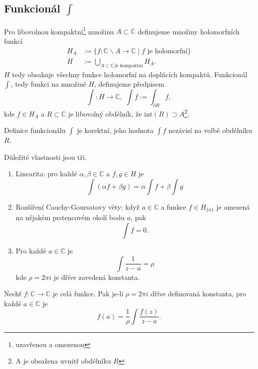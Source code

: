 \documentclass[../main.tex]{subfiles}
\begin{document}
\subsection{Funkcionál $\int$}

\begin{definition}[Funkcionál]
    Pro libovolnou kompaktní\footnote{uzavřenou a omezenou} množinu $A\subset\mathbb{C}$
    definujeme množiny holomorfních funkcí 
    \begin{align*}
        H_A &:= \{ f: \mathbb{C}\backslash A \to \mathbb{C} \mid f \,\,\text{je holomorfní} \}\\
        H &:= \bigcup_{A\subset\mathbb{C}\,\text{je kompaktní}} H_A.
    \end{align*}
    $H$ tedy obsahuje všechny funkce holomorfní na doplňcích kompaktů.
    Funkcionál $\int$, tedy funkci na množině $H$, definujeme předpisem
    \[ \int : H \to \mathbb{C}, \,\, \int f := \int_{\partial R}f, \]
    kde $f\in H_A$ a $R\subset\mathbb{C}$ je libovolný obdélník, že $\text{int}(R) \supset A$\footnote{A je obsažena uvnitř obdélníku $R$}.
\end{definition}

\begin{lemma}
    Definice funkcionálu $\int$ je korektní, jeho hodnota $\int f$ nezávisí na volbě obdélníku $R$.
\end{lemma}

\begin{theorem}
    Důležité vlastnosti jsou tři.
    \begin{enumerate}
        \item Linearita: pro každé $\alpha,\beta \in \mathbb{C}$ a $f,g \in H$ je
        \[ \int(\alpha f + \beta g) = \alpha \int f + \beta \int g \]
        \item Rozšíření Cauchy-Goursatovy věty: když $a\in\mathbb{C}$ a funkce
        $f \in H_{\{a\}}$ je omezená na nějakém prstencovém okolí bodu $a$, pak
        \[ \int f = 0. \]
        \item Pro každé $a\in\mathbb{C}$ je
        \[ \int \frac{1}{z-a} = \rho \]
        kde $\rho = 2\pi i$ je dříve zavedená konstanta.
    \end{enumerate}
\end{theorem}


\begin{theorem}
    Nechť $f:\mathbb{C}\to\mathbb{C}$ je celá funkce. Pak je-li $\rho = 2\pi i$
    dříve definovaná konstanta, pro každé $a\in\mathbb{C}$ je
    \[ f(a) = \frac{1}{\rho}\int \frac{f(z)}{z-a}. \]
\end{theorem}
\end{document}
